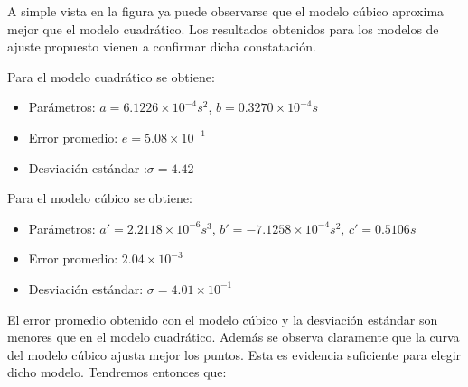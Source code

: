 \documentclass[main]{subfiles}
\begin{document}
A simple vista en la figura ya puede observarse que el modelo c\'ubico aproxima mejor que el modelo cuadr\'atico.
Los resultados obtenidos para los modelos de ajuste propuesto vienen a confirmar dicha constataci\'on.

Para el modelo cuadr\'atico se obtiene:
\begin{itemize}
\item Par\'ametros: $a=6.1226\times10^{-4}s^2$, $b=0.3270\times 10^{-4}s$
\item Error promedio: $e=5.08\times 10 ^{-1}$
\item Desviaci\'on est\'andar :$\sigma=4.42$
\end{itemize}

Para el modelo c\'ubico se obtiene:
\begin{itemize}
\item Par\'ametros: $a\prime = 2.2118\times 10^{-6}s^3$, $b\prime =-7.1258\times 10^{-4}s^2$, $c\prime=0.5106s$
\item Error promedio: $2.04\times10^{-3} $
\item Desviaci\'on est\'andar: $\sigma=4.01\times 10^{-1}$
\end{itemize}

El error promedio obtenido con el modelo c\'ubico y la desviaci\'on est\'andar son menores que en el modelo cuadr\'atico. Adem\'as se observa claramente que la curva del modelo c\'ubico ajusta mejor los puntos. Esta es evidencia suficiente para elegir dicho modelo. Tendremos entonces que:
\end{document}
